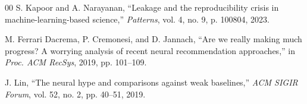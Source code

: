 \documentclass[conference]{IEEEtran}
\begin{document}
\begin{thebibliography}{00}
 S. Kapoor and A. Narayanan, ``Leakage and the reproducibility crisis in
machine-learning-based science,'' \emph{Patterns}, vol. 4, no. 9, p. 100804, 2023.

 M. Ferrari Dacrema, P. Cremonesi, and D. Jannach, ``Are we really
making much progress? A worrying analysis of recent neural recommendation approaches,'' in
\emph{Proc. ACM RecSys}, 2019, pp. 101--109.

 J. Lin, ``The neural hype and comparisons against weak baselines,''
\emph{ACM SIGIR Forum}, vol. 52, no. 2, pp. 40--51, 2019.

\end{thebibliography}
\end{document}
